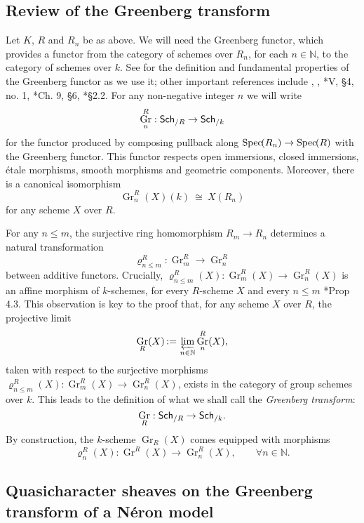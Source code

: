 \documentclass[CM,Submssn,SecEq]{degruyter-crelle} %
\theoremstyle{plain}
\theoremstyle{definition}
\theoremstyle{remark}
\newcommand{\NN}{{\mathbb{N}}}
\newcommand{\Fq}{k}
\DeclareMathOperator{\Gr}{Gr}
\newcommand{\Spec}[1]{{\operatorname{Spec}\hskip-1pt( #1 )}}
\newcommand{\ceq}{{\, :=\, }}
\newcommand{\iso}{{\ \cong\ }}
\newcommand{\catname}[1]{\normalfont{\textsf{#1}}}
\newcommand{\Sch}[1]{{\catname{Sch}_{/#1}}}
\begin{document}
\subsection{Review of the Greenberg transform} \label{ssec:rev_Greenberg}

Let $K$, $R$ and $R_n$ be as above.
We will need the Greenberg functor, which provides
a functor from the category of schemes 
over $R_n$, for each $n\in \NN$, to the category of schemes over $\Fq$.
See \cite{bertrapelle-gonzales:Greenberg} for the definition and fundamental properties of the Greenberg functor as we use it; other important references include
\cite{greenberg:61}, \cite{greenberg:63a},
\cite{demazure-gabriel:GroupesAlgebriques}*{V, \S 4, no. 1},
\cite{bosch-lutkebohmert-reynaud:NeronModels}*{Ch. 9, \S 6},
\cite{nicaise-sebag:motivicSerre}*{\S 2.2}. %
%
For any non-negative integer $n$ we will write
\[
\Gr^R_n : \Sch{R} \to \Sch{\Fq}
\]
for the functor produced by composing pullback along $\Spec{R_n} \to \Spec{R}$ with the Greenberg functor. 
This functor respects open immersions, closed immersions, \'etale morphisms, smooth morphisms and geometric components.  Moreover, there is a canonical isomorphism
\[
\Gr^R_n(X)(\Fq) \iso X(R_n)
\]
for any scheme $X$ over $R$.

For any $n\leq m$,  the surjective ring homomorphism $R_{m} \to R_n$ determines a
natural transformation 
\[
\varrho^R_{n\leq m} : \Gr^R_{m} \to \Gr^R_n
\]
between additive functors.
Crucially, $\varrho^R_{n\leq m}(X): \Gr^R_{m}(X)\to \Gr^R_n(X)$ is an affine morphism of $\Fq$-schemes, for every $R$-scheme $X$ and every $n\leq m$ \cite{bertrapelle-gonzales:Greenberg}*{Prop 4.3}.
This observation is key to the proof that, for any scheme $X$ over $R$, the projective limit 
\[
\Gr_R(X) \ceq \varprojlim_{n\in \NN} \Gr^R_n(X),
\]
taken with respect to the surjective morphisms $\varrho^R_{n\leq m}(X) : \Gr^R_{m}(X) \to \Gr^R_n(X)$,
exists in the category of group schemes over $\Fq$.
This leads to the definition of what we shall call the {\it Greenberg transform}:
\[
\Gr_R : \Sch{R} \to \Sch{\Fq}.
\]
By construction, the $\Fq$-scheme $\Gr_R(X)$ comes equipped with morphisms 
\[
\varrho^R_n(X) : \Gr^R(X) \to \Gr^R_n(X),\qquad \forall n\in \NN.
\]

\subsection{Quasicharacter sheaves on the Greenberg transform of a N\'eron model} \label{ssec:qc_on_GN}
 
\end{document}
